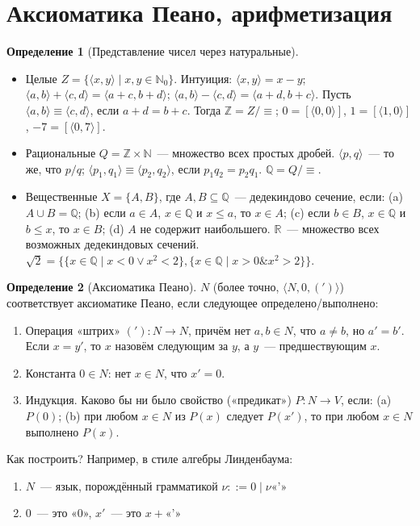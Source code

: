 \documentclass[a4paper,11pt]{article}
\theoremstyle{definition}
\newtheorem*{dfn}{Определение}
\newcommand{\amp}{\mathbin{\&}}
\begin{document}
\section{Аксиоматика Пеано, арифметизация}
\begin{dfn}[Представление чисел через натуральные]
\begin{itemize}
\item Целые $Z = \{\langle x, y\rangle \mid x, y \in \mathbb{N}_0\}$.
  Интуиция: $\langle x, y\rangle = x - y$; $\langle a, b\rangle + \langle c,
  d\rangle = \langle a + c, b + d\rangle$; $\langle a, b\rangle - \langle c,
  d\rangle = \langle a + d, b + c\rangle$. Пусть $\langle a, b\rangle \equiv
  \langle c, d\rangle$, если $a + d = b + c$. Тогда $\mathbb{Z} = Z/{\equiv}$;
  $0 = [\langle 0, 0\rangle]$, $1 = [\langle 1, 0\rangle]$, $-7 = [\langle 0,
  7\rangle]$.
\item Рациональные $Q = \mathbb{Z} \times \mathbb{N}$~--- множество всех простых
  дробей. $\langle p, q\rangle$~--- то же, что $p/q$; $\langle p_1, q_1\rangle
  \equiv \langle p_2, q_2\rangle$, если $p_1 q_2 = p_2 q_1$. $\mathbb{Q} =
  Q/{\equiv}$.
\item Вещественные $X = \{A, B\}$, где $A, B \subseteq \mathbb{Q}$~---
  дедекиндово сечение, если: (a) $A \cup B = \mathbb{Q}$; (b) если $a \in A$,
  $x \in \mathbb{Q}$ и $x \le a$, то $x \in A$; (c) если $b \in B$, $x \in
  \mathbb{Q}$ и $b \le x$, то $x \in B$; (d) $A$ не содержит наибольшего.
  $\mathbb{R}$~--- множество всех возможных дедекиндовых сечений.
  $\sqrt{2} = \{\{x \in \mathbb{Q} \mid x < 0 \vee x^2 < 2\}, \{x \in
  \mathbb{Q} \mid x > 0 \amp x^2 > 2\}\}$.
\end{itemize}
\end{dfn}
\begin{dfn}[Аксиоматика Пеано]
$N$ (более точно, $\langle N, 0, (')\rangle$) соответствует аксиоматике Пеано,
если следующее определено/выполнено:
\begin{enumerate}
\item Операция «штрих» $(') : N \to N$, причём нет $a, b \in N$, что $a \ne b$,
  но $a' = b'$. Если $x = y'$, то $x$ назовём следующим за $y$, а $y$~---
  предшествующим $x$.
\item Константа $0 \in N$: нет $x \in N$, что $x' = 0$.
\item Индукция. Каково бы ни было свойство («предикат») $P : N \to V$, если:
  (a) $P(0)$; (b) при любом $x \in N$ из $P(x)$ следует $P(x')$, то при любом
  $x \in N$ выполнено $P(x)$.
\end{enumerate}
Как построить? Например, в стиле алгебры Линденбаума:
\begin{enumerate}
\item $N$~--- язык, порождённый грамматикой $\nu ::= 0 \mid \nu\text{«'»}$
\item $0$~--- это «0», $x'$~--- это $x + \text{«'»}$
\end{enumerate}
\end{dfn}
\end{document}
